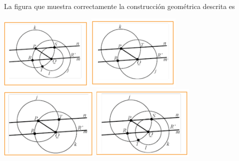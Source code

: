 \documentclass[10pt,addpoints]{exam}
\begin{document}
\begin{questions}
\begin{enumerate}
\end{enumerate}
La figura que muestra correctamente la construcción geométrica descrita es
\begin{choices}
\begin{multicols}{2}
\CorrectChoice \includegraphics[scale=.65]{Images/Pantallazo-41.png} 
\choice \includegraphics[scale=.65]{Images/Pantallazo-42.png} 
\choice \includegraphics[scale=.65]{Images/Pantallazo-43.png} 
\choice \includegraphics[scale=.65]{Images/Pantallazo-44.png} 
\end{multicols}
\end{choices}
\end{questions}
\end{document}
